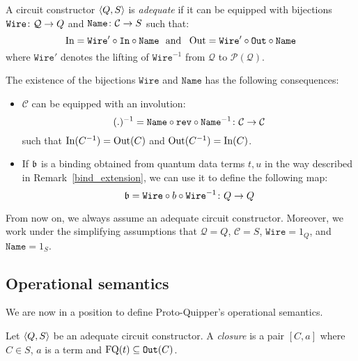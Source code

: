 \documentclass[twoside]{article}
\begin{document}
\begin{definition}
A circuit constructor $\langle Q,S\rangle$ is \emph{adequate} if it can 
be equipped with bijections $\mathtt{Wire}\colon \mathcal{Q} \to Q$ 
and $\mathtt{Name}\colon \mathcal{C} \to S$ such that:
\[\mathop{\textrm{In}}\nolimits=\mathtt{Wire}' \circ\mathtt{In}\circ \mathtt{Name} 
~\mbox{ and }~ 
\mathop{\textrm{Out}}\nolimits=\mathtt{Wire}'\circ\mathtt{Out}\circ \mathtt{Name}
\]
where $\mathtt{Wire}'$ denotes the lifting of $\mathtt{Wire}^{-1}$ 
from $\mathcal{Q}$ to $\mathcal{P}(\mathcal{Q})$.
\end{definition}

\begin{remark}
\label{structure-transfer}
The existence of the bijections $\mathtt{Wire}$ and $\mathtt{Name}$ has 
the following consequences:
\begin{itemize}
  \item $\mathcal{C}$ can be equipped with an involution:
\[
(.)^{-1} = \mathtt{Name}\circ \mathtt{rev} \circ \mathtt{Name}^{-1}
           \colon \mathcal{C}\to\mathcal{C}
\]
such that $\mathop{\textrm{In}}\nolimits(C^{-1})=\mathop{\textrm{Out}}\nolimits(C)$ and 
$\mathop{\textrm{Out}}\nolimits(C^{-1})=\mathop{\textrm{In}}\nolimits(C)$.
  \item If $\mathfrak{b}$ is a binding obtained from quantum data terms $t,u$ in the 
  way described in Remark~\hyperref[bind_extension]{\ref*{bind_extension}}, 
  we can use it to define the following map:
  \[
  \mathfrak{b} = \mathtt{Wire}\circ b\circ \mathtt{Wire}^{-1}\colon Q\to Q
  \]
\end{itemize}

From now on, we always assume an adequate circuit constructor. Moreover, we work 
under the simplifying assumptions that $\mathcal{Q}=Q$,
$\mathcal{C}=S$, $\mathtt{Wire}=1_Q$, and $\mathtt{Name}=1_S$.
\end{remark}


\subsection{Operational semantics}

We are now in a position to define Proto-Quipper's operational 
semantics.

\begin{definition}
Let $\langle Q,S\rangle$ be an adequate circuit constructor. A 
\emph{closure} is a pair $[C,a]$ where $C\in S$, $a$ is a 
term and $\mathop{\textrm{FQ}}\nolimits(t)\subseteq\mathtt{Out}(C)$. 
\end{definition}

\end{document}
